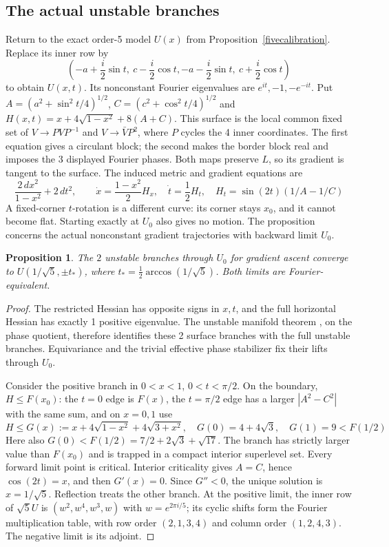 \documentclass[11pt,a4paper]{article}
\newtheorem{prop}[thm]{Proposition}
\begin{document}
\subsection{The actual unstable branches}
Return to the exact order-5 model $U(x)$ from
Proposition~\ref{fivecalibration}. Replace its inner row by
\[
 (-a+\frac i2\sin t,\ c-\frac i2\cos t,
  -a-\frac i2\sin t,\ c+\frac i2\cos t)
\]
to obtain $U(x,t)$. Its nonconstant Fourier eigenvalues are
$e^{it},-1,-e^{-it}$. Put
$A=(a^2+\sin^2t/4)^{1/2}$, $C=(c^2+\cos^2t/4)^{1/2}$ and
$H(x,t)=x+4\sqrt{1-x^2}+8(A+C)$.
This surface is the local common fixed set of
$V\to PVP^{-1}$ and $V\to\bar V P^2$, where $P$ cycles the
4 inner coordinates. The first equation gives a circulant block;
the second makes the border block real and imposes the 3 displayed
Fourier phases. Both maps preserve $L$, so its gradient is tangent to
the surface. The induced metric and gradient equations are
\[
 \frac{2\,dx^2}{1-x^2}+2\,dt^2,\qquad
 \dot x=\frac{1-x^2}{2}H_x,\quad \dot t=\frac12H_t,
 \quad H_t=\sin(2t)(1/A-1/C)
\]
A fixed-corner $t$-rotation is a different curve: its corner stays
$x_0$, and it cannot become flat. Starting exactly at $U_0$ also gives
no motion. The proposition concerns the actual nonconstant gradient
trajectories with backward limit $U_0$.

\begin{prop}\label{branches}
The $2$ unstable branches through $U_0$ for gradient ascent converge to
$U(1/\sqrt5,\pm t_*)$, where $t_*=\frac12\arccos(1/\sqrt5)$.
Both limits are Fourier-equivalent.
\end{prop}
\begin{proof}
The restricted Hessian has opposite signs in $x,t$, and the full
horizontal Hessian has exactly 1 positive eigenvalue. The unstable
manifold theorem \cite{T}, on the phase quotient, therefore identifies
these 2 surface branches with the full unstable branches. Equivariance
and the trivial effective phase stabilizer fix their lifts through $U_0$.

Consider the positive branch in $0<x<1$, $0<t<\pi/2$.
On the boundary, $H\le F(x_0)$: the $t=0$ edge is $F(x)$, the
$t=\pi/2$ edge has a larger $|A^2-C^2|$ with the same sum, and
on $x=0,1$ use
\[
 H\le G(x):=x+4\sqrt{1-x^2}+4\sqrt{3+x^2},\quad
 G(0)=4+4\sqrt3,\quad G(1)=9<F(1/2)
\]
Here also $G(0)<F(1/2)=7/2+2\sqrt3+\sqrt{17}$.
The branch has strictly larger value than $F(x_0)$ and is trapped in
a compact interior superlevel set. Every forward limit point is
critical. Interior criticality gives $A=C$, hence $\cos(2t)=x$, and
then $G'(x)=0$. Since $G''<0$, the unique solution is $x=1/\sqrt5$.
Reflection treats the other branch. At the positive limit, the inner
row of $\sqrt5U$ is $(w^2,w^4,w^3,w)$ with $w=e^{2\pi i/5}$;
its cyclic shifts form the Fourier multiplication table, with row order
$(2,1,3,4)$ and column order $(1,2,4,3)$. The negative limit is its adjoint.
\end{proof}
\end{document}

